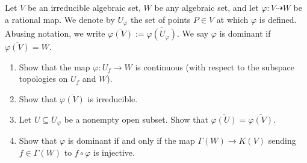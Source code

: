 \documentclass[11pt,letterpaper]{article}
\begin{document}
\begin{problem}
    Let $V$ be an irreducible algebraic set, $W$ be any algebraic set, and let $\varphi:V\dashrightarrow W$ be a rational map. We denote by $U_\varphi$ the set of points $P\in V$ at which $\varphi$ is defined. Abusing notation, we write $\overline{\varphi(V)} := \overline{\varphi(U_\varphi)}$. We say $\varphi$ is dominant if $\overline{\varphi(V)} = W$.
    \begin{enumerate}[label=\alph*)]
        \item Show that the map $\varphi:U_f\rightarrow W$ is continuous (with respect to the subspace topologies on $U_f$ and $W$).
        \item Show that $\overline{\varphi(V)}$ is irreducible.
        \item Let $U\subseteq U_\varphi$ be a nonempty open subset. Show that $\overline{\varphi(U)} = \overline{\varphi(V)}$.
        \item Show that $\varphi$ is dominant if and only if the map $\Gamma(W) \rightarrow K(V)$ sending $f\in\Gamma(W)$ to $f\circ\varphi$ is injective.
    \end{enumerate}
\end{problem}
\end{document}
